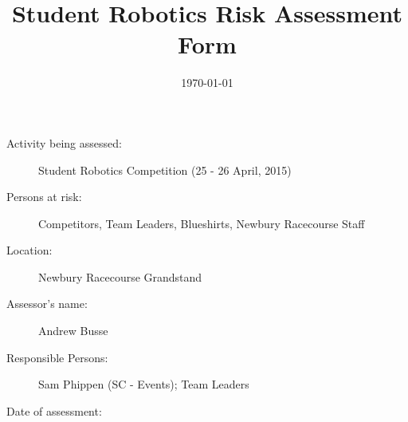 \documentclass[12pt,a4paper]{scrartcl}
\title{Student Robotics Risk Assessment Form}
\begin{document}
\maketitle

\begin{description}
\item[Activity being assessed:] Student Robotics Competition (25 - 26 April, 2015)
\item[Persons at risk:] Competitors, Team Leaders, Blueshirts, Newbury Racecourse Staff
\item[Location:] Newbury Racecourse Grandstand
\end{description}

\begin{description}
\item[Assessor's name:] Andrew Busse
\item[Responsible Persons:] Sam Phippen (SC - Events); Team Leaders
\item[Date of assessment:] \date{\today}
\end{description}
\clearpage

\newcommand{\risk}[4]{
 #1 & #2 & #3 & #4 \\
}
\end{document}
